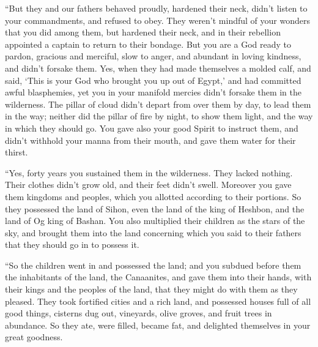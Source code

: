  ``But they and our fathers behaved proudly, hardened their
neck, didn't listen to your commandments,  and refused to
obey. They weren't mindful of your wonders that you did among them, but
hardened their neck, and in their rebellion appointed a captain to
return to their bondage. But you are a God ready to pardon, gracious and
merciful, slow to anger, and abundant in loving kindness, and didn't
forsake them.  Yes, when they had made themselves a molded
calf, and said, `This is your God who brought you up out of Egypt,' and
had committed awful blasphemies,  yet you in your manifold
mercies didn't forsake them in the wilderness. The pillar of cloud
didn't depart from over them by day, to lead them in the way; neither
did the pillar of fire by night, to show them light, and the way in
which they should go.  You gave also your good Spirit to
instruct them, and didn't withhold your manna from their mouth, and gave
them water for their thirst.

 ``Yes, forty years you sustained them in the wilderness.
They lacked nothing. Their clothes didn't grow old, and their feet
didn't swell.  Moreover you gave them kingdoms and peoples,
which you allotted according to their portions. So they possessed the
land of Sihon, even the land of the king of Heshbon, and the land of Og
king of Bashan.  You also multiplied their children as the
stars of the sky, and brought them into the land concerning which you
said to their fathers that they should go in to possess it.

 ``So the children went in and possessed the land; and you
subdued before them the inhabitants of the land, the Canaanites, and
gave them into their hands, with their kings and the peoples of the
land, that they might do with them as they pleased.  They
took fortified cities and a rich land, and possessed houses full of all
good things, cisterns dug out, vineyards, olive groves, and fruit trees
in abundance. So they ate, were filled, became fat, and delighted
themselves in your great goodness.

